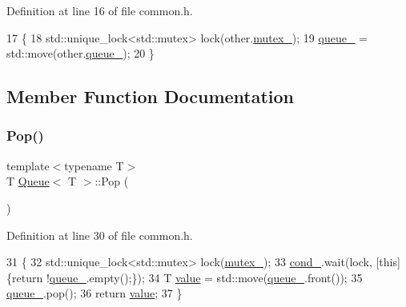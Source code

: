 Definition at line 16 of file common.\+h.


\begin{DoxyCode}
17     \{
18         std::unique\_lock<std::mutex> lock(other.\mbox{\hyperlink{class_queue_ad341bfdf4d075ed6ab4807da10e703cd}{mutex\_}});
19         \mbox{\hyperlink{class_queue_a60e7a5aba900b055cd0668755c0dfadd}{queue\_}} = std::move(other.\mbox{\hyperlink{class_queue_a60e7a5aba900b055cd0668755c0dfadd}{queue\_}});
20     \}
\end{DoxyCode}


\subsection{Member Function Documentation}
\mbox{\label{class_queue_a5897608241a6c919354cdc1a1815c0ae}} 
\subsubsection{\texorpdfstring{Pop()}{Pop()}}
{\footnotesize\ttfamily template$<$typename T$>$ \\
T \mbox{\hyperlink{class_queue}{Queue}}$<$ T $>$\+::Pop (\begin{DoxyParamCaption}{ }\end{DoxyParamCaption})\hspace{0.3cm}{\ttfamily [inline]}}



Definition at line 30 of file common.\+h.


\begin{DoxyCode}
31     \{
32         std::unique\_lock<std::mutex> lock(\mbox{\hyperlink{class_queue_ad341bfdf4d075ed6ab4807da10e703cd}{mutex\_}});
33         \mbox{\hyperlink{class_queue_aeb109ed25687457524a70b03a2584b6d}{cond\_}}.wait(lock, [\textcolor{keyword}{this}]\{\textcolor{keywordflow}{return} !\mbox{\hyperlink{class_queue_a60e7a5aba900b055cd0668755c0dfadd}{queue\_}}.empty();\});
34         T \mbox{\hyperlink{struct_g_m_l__pair_aef8797e7d2fc0d2e2f628ce9c2783a6c}{value}} = std::move(\mbox{\hyperlink{class_queue_a60e7a5aba900b055cd0668755c0dfadd}{queue\_}}.front());
35         \mbox{\hyperlink{class_queue_a60e7a5aba900b055cd0668755c0dfadd}{queue\_}}.pop();
36         \textcolor{keywordflow}{return} \mbox{\hyperlink{struct_g_m_l__pair_aef8797e7d2fc0d2e2f628ce9c2783a6c}{value}};
37     \}
\end{DoxyCode}
\mbox{\label{class_queue_ace62235edaffc6f375d040c32c0ab651}} 
